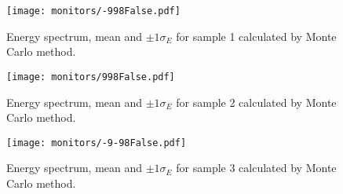 \begin{figure}[htb]
\texttt{[image: monitors/-998False.pdf]}
\caption{Energy spectrum, mean and $\pm 1\sigma_E$ for sample 1 calculated by Monte Carlo method.}
\label{fig:Spectrum1}
\end{figure}

\begin{figure}[htb]
\texttt{[image: monitors/998False.pdf]}
\caption{Energy spectrum, mean and $\pm 1\sigma_E$ for sample 2 calculated by Monte Carlo method.}
\label{fig:Spectrum2}
\end{figure}

\begin{figure}[htb]
\texttt{[image: monitors/-9-98False.pdf]}
\caption{Energy spectrum, mean and $\pm 1\sigma_E$ for sample 3 calculated by Monte Carlo method.}
\label{fig:Spectrum3}
\end{figure}

